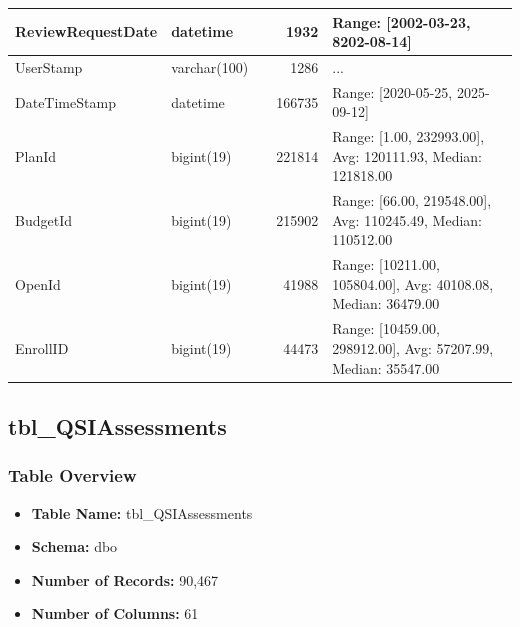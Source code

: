 \begin{landscape}
\begin{longtable}{|l|l|l|r|p{6cm}|}
\hline
ReviewRequestDate & datetime &  & 1932 & Range: [2002-03-23, 8202-08-14] \\
\hline
UserStamp & varchar(100) &  & 1286 & ... \\
\hline
DateTimeStamp & datetime &  & 166735 & Range: [2020-05-25, 2025-09-12] \\
\hline
PlanId & bigint(19) &  & 221814 & Range: [1.00, 232993.00], Avg: 120111.93, Median: 121818.00 \\
\hline
BudgetId & bigint(19) &  & 215902 & Range: [66.00, 219548.00], Avg: 110245.49, Median: 110512.00 \\
\hline
OpenId & bigint(19) &  & 41988 & Range: [10211.00, 105804.00], Avg: 40108.08, Median: 36479.00 \\
\hline
EnrollID & bigint(19) &  & 44473 & Range: [10459.00, 298912.00], Avg: 57207.99, Median: 35547.00 \\
\hline
\end{longtable}

\subsection{tbl\_QSIAssessments}

\subsubsection{Table Overview}
\begin{itemize}
\item \textbf{Table Name:} tbl\_QSIAssessments
\item \textbf{Schema:} dbo
\item \textbf{Number of Records:} 90,467
\item \textbf{Number of Columns:} 61
\end{itemize}


\end{landscape}
